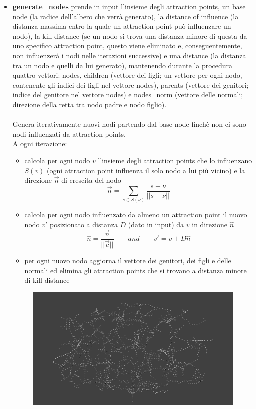 \documentclass[10pt,a4paper]{report}
\begin{document}
\begin{itemize}
\item \textbf{generate\_nodes} prende in input l'insieme degli attraction points, un base node (la radice dell'albero che verrà generato), la distance of influence (la distanza massima entro la quale un attraction point può influenzare un nodo), la kill distance (se un nodo si trova una distanza minore di questa da uno specifico attraction point, questo viene eliminato e, conseguentemente, non influenzerà i nodi nelle iterazioni successive) e una distance (la distanza tra un nodo e quelli da lui generato), mantenendo durante la procedura quattro vettori: nodes, children (vettore dei figli; un vettore per ogni nodo, contenente gli indici dei figli nel vettore nodes), parents (vettore dei genitori; indice del genitore nel vettore nodes) e nodes\_norm (vettore delle normali; direzione della retta tra nodo padre e nodo figlio).\\\\
Genera iterativamente nuovi nodi partendo dal base node finchè non ci sono nodi influenzati da attraction points.\\ A ogni iterazione:
\begin{itemize}
\item calcola per ogni nodo $v$ l'insieme degli attraction points che lo influenzano $S(v)$ (ogni attraction point influenza il solo nodo a lui più vicino) e la direzione $\vec{n}$ di crescita del nodo  $$ \vec{n}=\sum_{s \in S(\nu)} \frac{s-\nu}{||s-\nu||}$$
\item calcola per ogni nodo influenzato da almeno un attraction point il nuovo nodo $v'$ posizionato a distanza $D$ (dato in input) da $v$ in direzione $\hat{n}$
 $$\hat{n}=\frac{\vec{n}}{||\vec{c}||} \qquad and \qquad v' = v + D\hat{n}$$
\item per ogni nuovo nodo aggiorna il vettore dei genitori, dei figli e delle normali ed elimina gli attraction points che si trovano a distanza minore di kill distance
\end{itemize}
\begin{figure}[h!]
\centering
\includegraphics[scale=0.37]{nodes.png}

\end{figure}
\end{itemize}
\end{document}
